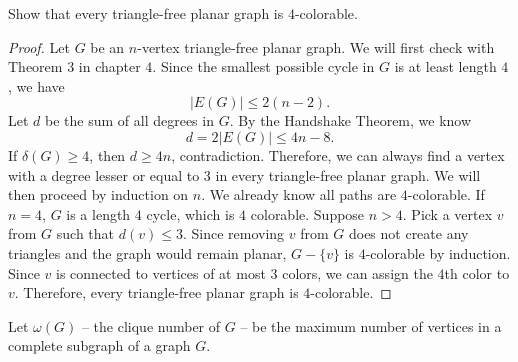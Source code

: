 \documentclass{article}
\newenvironment{problem}[2][Problem]{\begin{trivlist}
\item[\hskip \labelsep {\bfseries #1}\hskip \labelsep {\bfseries #2.}]}{\end{trivlist}}
\begin{document}
\begin{problem}{4.7.8}
    Show that every triangle-free planar graph is $4$-colorable.
\end{problem}

\begin{proof}
    Let $G$ be an $n$-vertex triangle-free planar graph. We will first check with Theorem $3$ in chapter $4$. Since the smallest possible cycle in $G$ is at least length $4$, we have 
    \[
        |E(G)| \leq 2(n - 2).
    \]
    Let $d$ be the sum of all degrees in $G$. By the Handshake Theorem, we know
    \[
        d = 2|E(G)| \leq 4n - 8.
    \]
    If $\delta(G) \geq 4$, then $d \geq 4n$, contradiction. Therefore, we can always find a vertex with a degree lesser or equal to $3$ in every triangle-free planar graph. We will then proceed by induction on $n$. We already know all paths are $4$-colorable. If $n = 4$, $G$ is a length $4$ cycle, which is $4$ colorable. Suppose $n > 4$. Pick a vertex $v$ from $G$ such that $d(v) \leq 3$. Since removing $v$ from $G$ does not create any triangles and the graph would remain planar, $G - \{v\}$ is $4$-colorable by induction. Since $v$ is connected to vertices of at most $3$ colors, we can assign the $4$th color to $v$. Therefore, every triangle-free planar graph is $4$-colorable.
\end{proof}

\begin{problem}{4.7.14}
    Let $\omega(G)$ – the clique number of $G$ – be the maximum number of vertices in a complete subgraph of a graph $G$.
\end{problem}
\end{document}
